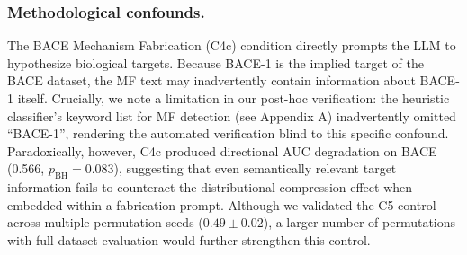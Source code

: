 \subsubsection*{Methodological confounds.} The BACE Mechanism Fabrication (C4c) condition directly prompts the LLM to hypothesize biological targets. Because BACE-1 is the implied target of the BACE dataset, the MF text may inadvertently contain information about BACE-1 itself. Crucially, we note a limitation in our post-hoc verification: the heuristic classifier's keyword list for MF detection (see Appendix A) inadvertently omitted ``BACE-1'', rendering the automated verification blind to this specific confound. Paradoxically, however, C4c produced directional AUC degradation on BACE (0.566, $p_{\text{BH}} = 0.083$), suggesting that even semantically relevant target information fails to counteract the distributional compression effect when embedded within a fabrication prompt. Although we validated the C5 control across multiple permutation seeds ($0.49 \pm 0.02$), a larger number of permutations with full-dataset evaluation would further strengthen this control.
